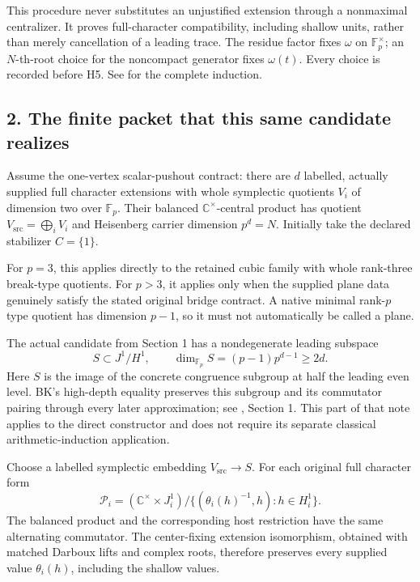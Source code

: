 This procedure never substitutes an unjustified extension through a
nonmaximal centralizer. It proves full-character compatibility,
including shallow units, rather than merely cancellation of a leading
trace. The residue factor fixes \(\omega\) on \(\mathbb F_p^\times\); an
\(N\)-th-root choice for the noncompact generator fixes \(\omega(t)\).
Every choice is recorded before H5. See
 for the
complete induction.

\hypertarget{odd_synthesis-the-finite-packet-that-this-same-candidate-realizes}{%
\subsection{2. The finite packet that this same candidate
realizes}\label{odd_synthesis-the-finite-packet-that-this-same-candidate-realizes}}

Assume the one-vertex scalar-pushout contract: there are \(d\) labelled,
actually supplied full character extensions with whole symplectic
quotients \(V_i\) of dimension two over \(\mathbb F_p\). Their balanced
\(\mathbb C^\times\)-central product has quotient
\(V_{\mathrm{src}}=\bigoplus_iV_i\) and Heisenberg carrier dimension
\(p^d=N\). Initially take the declared stabilizer \(C=\{1\}\).

For \(p=3\), this applies directly to the retained cubic family with
whole rank-three break-type quotients. For \(p>3\), it applies only when
the supplied plane data genuinely satisfy the stated original bridge
contract. A native minimal rank-\(p\) type quotient has dimension
\(p-1\), so it must not automatically be called a plane.

The actual candidate from Section 1 has a nondegenerate leading subspace
\[
S\subset J^1/H^1,\qquad
\dim_{\mathbb F_p}S=(p-1)p^{d-1}\ge2d.
\] Here \(S\) is the image of the concrete congruence subgroup at half
the leading even level. BK's high-depth equality preserves this subgroup
and its commutator pairing through every later approximation; see
, Section 1. This part
of that note applies to the direct constructor and does not require its
separate classical arithmetic-induction application.

Choose a labelled symplectic embedding \(V_{\mathrm{src}}\to S\). For
each original full character form \[
\mathcal P_i=(\mathbb C^\times\times J_i^1)/
 \{(\theta_i(h)^{-1},h):h\in H_i^1\}.
\] The balanced product and the corresponding host restriction have the
same alternating commutator. The center-fixing extension isomorphism,
obtained with matched Darboux lifts and complex roots, therefore
preserves every supplied value \(\theta_i(h)\), including the shallow
values.

